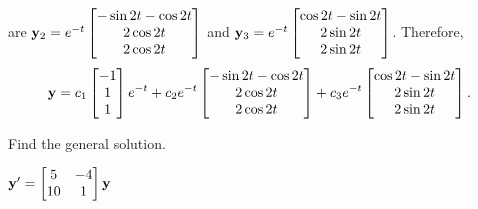 \documentclass{ximera}
\begin{document}
\begin{problem}
\begin{solution}
are ${\bf y}_2=e^{-t} \begin{bmatrix}-\sin2t-\cos2t\\2\cos2t\\2\cos2t \end{bmatrix}$
and ${\bf y}_3=e^{-t} \begin{bmatrix} \cos2t-\sin2t\\2\sin2t\\2\sin2t \end{bmatrix}$.
Therefore,   
$$
 {\bf
y}=c_1 \begin{bmatrix}-1\\1\\1 \end{bmatrix}e^{-t}+c_2e^{-t} \begin{bmatrix}-\sin
2t-\cos2t\\2\cos2t\\2\cos2t \end{bmatrix}+c_3e^{-t} \begin{bmatrix}
\cos2t-\sin2t\\2\sin2t\\2\sin2t \end{bmatrix}.
$$
\end{solution}
\end{problem}


 \begin{problem}\label{exer:10.6.9} 
 Find the general solution.
 
 $ {\bf y}'= \begin{bmatrix}5&-4\\10&1\end{bmatrix}{\bf
y}$
\end{problem}
\end{document}
